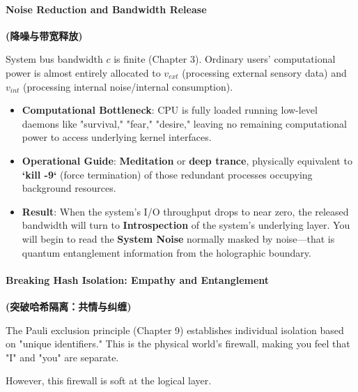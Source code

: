 \paragraph{Noise Reduction and Bandwidth Release}

\textbf{(降噪与带宽释放)}

System bus bandwidth $c$ is finite (Chapter 3). Ordinary users' computational power is almost entirely allocated to $v_{ext}$ (processing external sensory data) and $v_{int}$ (processing internal noise/internal consumption).

  \begin{itemize}
  \item \textbf{Computational Bottleneck}: CPU is fully loaded running low-level daemons like "survival," "fear," "desire," leaving no remaining computational power to access underlying kernel interfaces.

  \item \textbf{Operational Guide}: \textbf{Meditation} or \textbf{deep trance}, physically equivalent to \textbf{`kill -9`} (force termination) of those redundant processes occupying background resources.

  \item \textbf{Result}: When the system's I/O throughput drops to near zero, the released bandwidth will turn to \textbf{Introspection} of the system's underlying layer. You will begin to read the \textbf{System Noise} normally masked by noise—that is quantum entanglement information from the holographic boundary.
  \end{itemize}

\paragraph{Breaking Hash Isolation: Empathy and Entanglement}

\textbf{(突破哈希隔离：共情与纠缠)}

The Pauli exclusion principle (Chapter 9) establishes individual isolation based on "unique identifiers." This is the physical world's firewall, making you feel that "I" and "you" are separate.

However, this firewall is soft at the logical layer.

